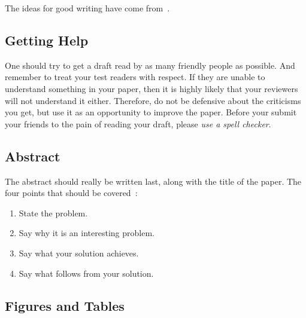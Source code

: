 The ideas for good writing have come
from~\cite{editor10,jones08,anderson04}.

\subsection{Getting Help}
One should try to get a draft read by as many friendly people as
possible. And remember to treat your test readers with respect. If
they are unable to understand something in your paper, then it is
highly likely that your reviewers will not understand it
either. Therefore, do not be defensive about the criticisms you get,
but use it as an opportunity to improve the paper. Before your submit
your friends to the pain of reading your draft, please \emph{use a
  spell checker}.

\subsection{Abstract}
The abstract should really be written last, along with the title of
the paper. The four points that should be covered~\cite{jones08}:
\begin{enumerate}
\item State the problem.
\item Say why it is an interesting problem.
\item Say what your solution achieves.
\item Say what follows from your solution.
\end{enumerate}

\subsection{Figures and Tables}

